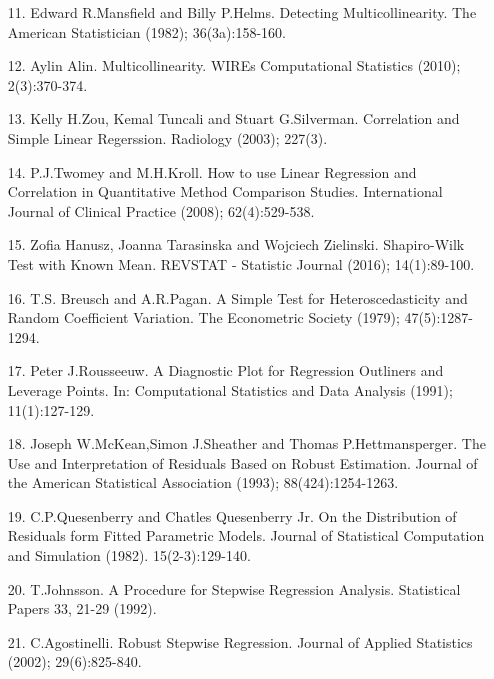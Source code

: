 \documentclass[a4paper]{article}
\begin{document}
\begin{itemize}
    \item[11.] Edward R.Mansfield and Billy P.Helms. Detecting Multicollinearity. The American Statistician (1982); 36(3a):158-160.
    
    \item[12.] Aylin Alin. Multicollinearity. WIREs Computational Statistics (2010); 2(3):370-374.
    
    \item[13.] Kelly H.Zou, Kemal Tuncali and Stuart G.Silverman. Correlation and Simple Linear Regerssion. Radiology (2003); 227(3).
    
    \item[14.] P.J.Twomey and M.H.Kroll. How to use Linear Regression and Correlation in Quantitative Method Comparison Studies. International Journal of Clinical Practice (2008); 62(4):529-538.
    
    \item[15.] Zofia Hanusz, Joanna Tarasinska and Wojciech Zielinski. Shapiro-Wilk Test with Known Mean. REVSTAT - Statistic Journal (2016); 14(1):89-100.
    
    \item[16.] T.S. Breusch and A.R.Pagan. A Simple Test for Heteroscedasticity and Random Coefficient Variation. The Econometric Society (1979); 47(5):1287-1294.
    
    \item[17.] Peter J.Rousseeuw. A Diagnostic Plot for Regression Outliners and Leverage Points. In: Computational Statistics and Data Analysis (1991); 11(1):127-129.
    
    \item[18.] Joseph W.McKean,Simon J.Sheather and Thomas P.Hettmansperger. The Use and Interpretation of Residuals Based on Robust Estimation. Journal of the American Statistical Association (1993); 88(424):1254-1263.
    
    \item[19.] C.P.Quesenberry and Chatles Quesenberry Jr. On the Distribution of Residuals form Fitted Parametric Models. Journal of Statistical Computation and Simulation (1982). 15(2-3):129-140.
    
    \item[20.] T.Johnsson. A Procedure for Stepwise Regression Analysis. Statistical Papers 33, 21-29 (1992).
    
    \item[21.] C.Agostinelli. Robust Stepwise Regression. Journal of Applied Statistics (2002); 29(6):825-840.
\end{itemize} 
\end{document}
